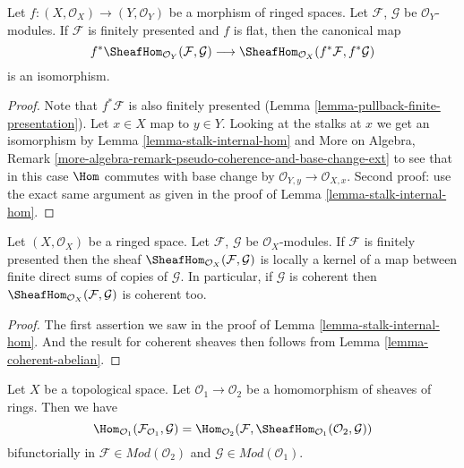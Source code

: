 \begin{lemma}
\label{lemma-pullback-internal-hom}
Let $f : (X, \mathcal{O}_X) \to (Y, \mathcal{O}_Y)$ be a morphism
of ringed spaces. Let $\mathcal{F}$, $\mathcal{G}$ be $\mathcal{O}_Y$-modules.
If $\mathcal{F}$ is finitely presented and $f$ is flat,
then the canonical map
$$
f^*\SheafHom_{\mathcal{O}_Y}(\mathcal{F}, \mathcal{G})
\longrightarrow
\SheafHom_{\mathcal{O}_X}(f^*\mathcal{F}, f^*\mathcal{G})
$$
is an isomorphism.
\end{lemma}

\begin{proof}
Note that $f^*\mathcal{F}$ is also finitely presented
(Lemma \ref{lemma-pullback-finite-presentation}).
Let $x \in X$ map to $y \in Y$. Looking at the stalks
at $x$ we get an isomorphism by
Lemma \ref{lemma-stalk-internal-hom} and
More on Algebra, Remark
\ref{more-algebra-remark-pseudo-coherence-and-base-change-ext}
to see that in this case $\Hom$ commutes with base change by
$\mathcal{O}_{Y, y} \to \mathcal{O}_{X, x}$.
Second proof: use the exact same argument as given
in the proof of Lemma \ref{lemma-stalk-internal-hom}.
\end{proof}

\begin{lemma}
\label{lemma-internal-hom-locally-kernel-direct-sum}
Let $(X, \mathcal{O}_X)$ be a ringed space.
Let $\mathcal{F}$, $\mathcal{G}$ be $\mathcal{O}_X$-modules.
If $\mathcal{F}$ is finitely presented then the sheaf
$\SheafHom_{\mathcal{O}_X}(\mathcal{F}, \mathcal{G})$ is
locally a kernel of a map between finite direct sums
of copies of $\mathcal{G}$.
In particular, if $\mathcal{G}$ is coherent then
$\SheafHom_{\mathcal{O}_X}(\mathcal{F}, \mathcal{G})$
is coherent too.
\end{lemma}

\begin{proof}
The first assertion
we saw in the proof of Lemma \ref{lemma-stalk-internal-hom}.
And the result for coherent sheaves then follows from
Lemma \ref{lemma-coherent-abelian}.
\end{proof}

\begin{lemma}
\label{lemma-adjoint-tensor-restrict}
Let $X$ be a topological space. Let $\mathcal{O}_1 \to \mathcal{O}_2$
be a homomorphism of sheaves of rings. Then we have
$$
\Hom_{\mathcal{O}_1}(\mathcal{F}_{\mathcal{O}_1}, \mathcal{G}) =
\Hom_{\mathcal{O}_2}(\mathcal{F},
\SheafHom_{\mathcal{O}_1}(\mathcal{O}_2, \mathcal{G}))
$$
bifunctorially in $\mathcal{F} \in \textit{Mod}(\mathcal{O}_2)$
and $\mathcal{G} \in \textit{Mod}(\mathcal{O}_1)$.
\end{lemma}

